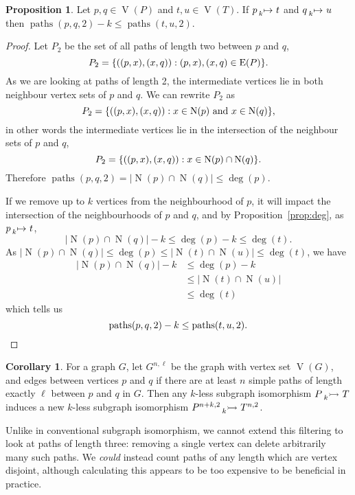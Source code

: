 \documentclass[letterpaper]{article}
\theoremstyle{definition}
\newtheorem{corollary}{Corollary}
\newtheorem{proposition}{Proposition}
\newcommand{\paths}{\operatorname{paths}}
\newcommand{\lessnonind}[1]{\prescript{}{#1}{\rightarrowtail}\ }
\newcommand{\lessmap}[1]{\prescript{}{#1}{\mapsto}\ }
\newcommand{\V}{\operatorname{V}}
\newcommand{\N}{\operatorname{N}}
\begin{document}
\begin{proposition}\label{prop:paths}
    Let $p,q \in \V(P)$ and $t,u\in \V(T)$. If $p \lessmap{k} t$ and $q \lessmap{k} u$ then
     $\paths(p, q, 2) - k \le \paths(t, u, 2)$.
\end{proposition}
\begin{proof}
Let $P_{2}$ be the set of all paths of length two between $p$ and $q$, \[P_{2} = \{((p,x),(x,q)) :
(p,x),(x,q)\in \operatorname{E}(P) \}\textnormal{.}\] As we are looking at paths of length 2,
the intermediate vertices lie in both neighbour vertex sets of $p$ and $q$. We can rewrite
$P_{2}$ as \[P_{2} = \{((p,x),(x,q)) : x\in \N(p) \text{ and } x\in \N(q) \}\textnormal{,}\] in
other words the intermediate vertices lie in the intersection of the neighbour sets of $p$ and
$q$, \[ P_{2}=\{((p,x),(x,q)) : x\in \N(p)\cap \N(q) \} \textnormal{.}\] Therefore
$\paths(p,q,2) = \left| \N(p)\cap \N(q) \right|  \leq \deg(p)$.

If we remove up to $k$ vertices from the neighbourhood of $p$, it will impact the intersection of
    the neighbourhoods of $p$ and $q$, and by Proposition~\ref{prop:deg}, as $p\lessmap{k}t$,
\[
\left| \N(p)\cap \N(q)\right| - k \leq \deg(p) - k \leq \deg(t).
\]
As $\left|\N(p)\cap \N(q)\right|\leq \deg(p) \leq \left|\N(t)\cap \N(u)\right|\leq \deg(t)$, we have
\begin{align*}
\left|\N(p)\cap \N(q)\right| - k & \leq \deg(p) - k \\
 & \leq \left|\N(t)\cap \N(u)\right|\\
 & \leq \deg(t)
\end{align*}
which tells us
\[
\paths(p, q, 2) - k \leq \paths(t, u, 2). \qedhere
\]
\end{proof}

\begin{corollary}
    For a graph $G$, let $G^{n, \ell}$ be the graph with vertex set $\V(G)$, and edges between vertices $p$ and $q$ if there are at least $n$ simple paths of
    length exactly $\ell$ between $p$ and $q$ in $G$. Then any $k$-less subgraph isomorphism
    $P \lessnonind{k} T$ induces a new $k$-less subgraph isomorphism
    $P^{n+k, 2}\lessnonind{k} T^{n, 2}$.
\end{corollary}

Unlike in conventional subgraph isomorphism, we cannot extend this filtering to look at paths of
length three: removing a single vertex can delete arbitrarily many such paths. We \emph{could}
instead count paths of any length which are vertex disjoint, although calculating this appears to be
too expensive to be beneficial in practice.
\end{document}
